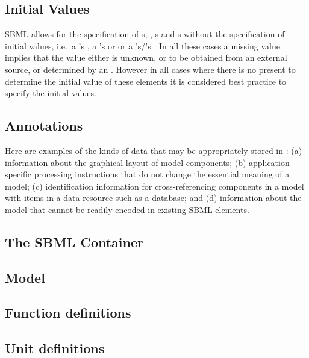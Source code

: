 \subsection{Initial Values}
\label{sec:bp:initialvalues}
SBML allows for the specification of \Compartment{}s, \Species, 
\Parameter{}s and \LocalParameter{}s without the specification of 
initial values, i.e.\ a \Compartment{}'s , a \Species{}'s 
 or  or a 
\Parameter{}'s/\LocalParameter{}'s . In all these cases 
a missing value implies that the value either is unknown, or to be 
obtained from an external source, or determined by an \InitialAssignment. 
However in all cases where 
there is no \InitialAssignment present to determine the initial value
of these elements it is considered best practice to specify the 
initial values.

\subsection{Annotations}
\label{sec:bp:annotations}

Here are examples of the kinds of data that may be appropriately
stored in : (a) information about the graphical
layout of model components; (b) application-specific processing
instructions that do not change the essential meaning of a model;
(c) identification information for cross-referencing components in
a model with items in a data resource such as a database;
  and (d) information about the model that cannot be
  readily encoded in existing SBML elements.



\subsection{The SBML Container}
\label{sec:bp:sbml}

\subsection{Model}
\label{sec:bp:model}


\subsection{Function definitions}
\label{sec:bp:functions}

\subsection{Unit definitions}
\label{sec:bp:unitdefinitions}

